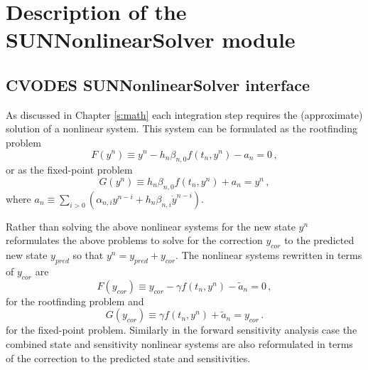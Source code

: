 \chapter{Description of the SUNNonlinearSolver module}\label{c:sunnonlinsol}


\section{CVODES SUNNonlinearSolver interface}
\label{s:sunnonlinsol_interface}

As discussed in Chapter \ref{s:math} each integration step requires the
(approximate) solution of a nonlinear system. This system can be formulated as
the rootfinding problem
\begin{equation}
  F(y^n) \equiv y^n - h_n \beta_{n,0} f(t_n,y^n) - a_n = 0 \, ,
\end{equation}
or as the fixed-point problem
\begin{equation}
  G(y^n) \equiv h_n \beta_{n,0} f(t_n,y^n) + a_n = y^n \, ,
\end{equation}
where $a_n\equiv\sum_{i>0}(\alpha_{n,i}y^{n-i}+h_n\beta_{n,i} {\dot{y}}^{n-i})$.

Rather than solving the above nonlinear systems for the new state $y^n$
{\cvodes} reformulates the above problems to solve for the correction $y_{cor}$
to the predicted new state $y_{pred}$ so that $y^n = y_{pred} + y_{cor}$.
The nonlinear systems rewritten in terms of $y_{cor}$ are
\begin{equation} \label{eq:res_corrector}
  F(y_{cor}) \equiv y_{cor} - \gamma f(t_n, y^n) - \tilde{a}_n = 0 \, ,
\end{equation}
for the rootfinding problem and
\begin{equation} \label{eq:fp_corrector}
  G(y_{cor}) \equiv \gamma f(t_n, y^n) + \tilde{a}_n = y_{cor} \, .
\end{equation}
for the fixed-point problem.
Similarly in the forward sensitivity analysis case the combined state and
sensitivity nonlinear systems are also reformulated in terms of the correction
to the predicted state and sensitivities.

